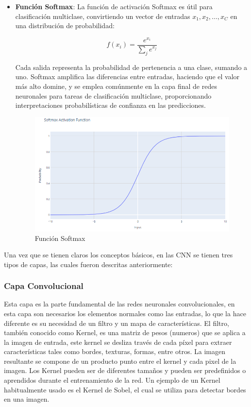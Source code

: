 \begin{itemize}
    \item \textbf{Función Softmax}:
    La función de activación Softmax es útil para clasificación multiclase, 
    convirtiendo un vector de entradas \( x_1, x_2, \dots, x_C \) en una distribución de probabilidad:

    \[
    f(x_i) = \frac{e^{x_i}}{\sum_{j} e^{x_j}}
    \]

    Cada salida representa la probabilidad de pertenencia a una clase, sumando a uno. 
    Softmax amplifica las diferencias entre entradas, haciendo que el valor más alto domine, 
    y se emplea comúnmente en la capa final de redes neuronales para tareas de clasificación 
    multiclase, proporcionando interpretaciones probabilísticas de confianza en las predicciones.
    \cite{activation_functions}

    \begin{figure}[H]
        \centering
        \includegraphics[width=\linewidth]{src/figures/softmax.png}
        \caption{Función Softmax \cite{softmax_graph}}
    \end{figure}
    
\end{itemize}

Una vez que se tienen claros los conceptos básicos, en las CNN se 
tienen tres tipos de capas, las cuales fueron descritas anteriormente:

\subsubsection{Capa Convolucional}

Esta capa es la parte fundamental de las redes neuronales convolucionales,
en esta capa son necesarios los elementos normales como las entradas, lo 
que la hace diferente es su necesidad de un filtro y un mapa de 
características. El filtro, también conocido como Kernel, es una matriz
de pesos (numeros) que se aplica a la imagen de entrada, este kernel se
desliza través de cada píxel para extraer características tales 
como bordes, texturas, formas, entre otros. La imagen resultante se
compone de un producto punto entre el kernel y cada pixel de la imagen. 
Los Kernel pueden ser de diferentes tamaños y pueden ser predefinidos 
o aprendidos durante el entrenamiento de la red.
Un ejemplo de un Kernel habitualmente usado es el Kernel de Sobel, el
cual se utiliza para detectar bordes en una imagen.

